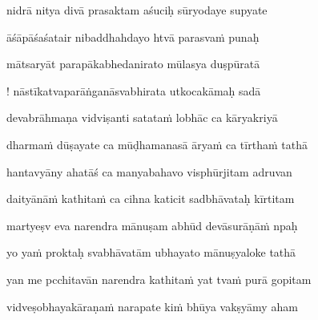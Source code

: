 \ujvers\nemsloka 
nidrā nitya divā prasaktam aśuciḥ sūryodaye supyate
\dontdisplaylinenum

\nemslokab 
āśāpāśaśatair nibaddhahdayo htvā parasvaṁ punaḥ \danda\dontdisplaylinenum

\nemslokac 
mātsaryāt parapākabhedanirato mūlasya duṣpūratā
\dontdisplaylinenum

\nemslokad 
! nāstīkatvaparāṅganāsvabhirata utkocakāmaḥ sadā \veg\dontdisplaylinenum
{}

\ujvers\nemsloka 
devabrāhmaṇa vidviṣanti satataṁ lobhāc ca kāryakriyā
\dontdisplaylinenum

\nemslokab 
dharmaṁ dūṣayate ca mūḍhamanasā āryaṁ ca tīrthaṁ tathā \danda\dontdisplaylinenum

\nemslokac 
hantavyāny ahatāś ca manyabahavo visphūrjitam adruvan
\dontdisplaylinenum

\nemslokad 
daityānāṁ kathitaṁ ca cihna katicit sadbhāvataḥ kīrtitam \veg\dontdisplaylinenum
{}

\ujvers\nemsloka 
martyeṣv eva narendra mānuṣam abhūd devāsurāṇāṁ npaḥ
\dontdisplaylinenum

\nemslokab 
yo yaṁ proktaḥ svabhāvatām ubhayato mānuṣyaloke tathā \danda\dontdisplaylinenum

\nemslokac 
yan me pcchitavān narendra kathitaṁ yat tvaṁ purā gopitam
\dontdisplaylinenum

\nemslokad 
vidveṣobhayakāraṇaṁ narapate kiṁ bhūya vakṣyāmy aham \veg\dontdisplaylinenum


\vers
{}

